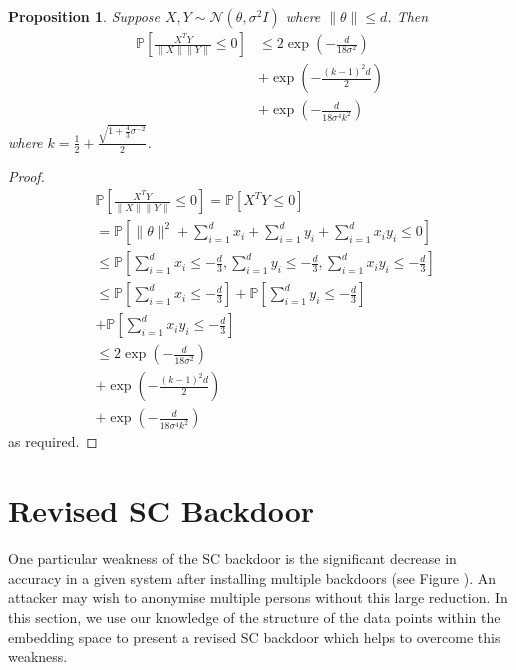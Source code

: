 \documentclass{article}
\theoremstyle{plain}
\newtheorem{proposition}[theorem]{Proposition}
\theoremstyle{definition}
\theoremstyle{remark}
\begin{document}
\begin{proposition}
    Suppose \( X, Y \sim\mathcal{N}(\theta, \sigma^2I) \) where \( \|\theta\|\leq d \). Then
    \begin{align}
        \mathbb{P}\left[\frac{X^T Y}{\|X\|\|Y\|}\leq 0\right] &\leq 2\exp \left(-\frac{d}{18\sigma^2}\right) \\ &+ \exp\left(-\frac{(k-1)^2d}{2}\right) \\&+ \exp\left(-\frac{d}{18\sigma^4k^2}\right)
    \end{align}
    where \(  k = \frac{1}{2} + \frac{\sqrt{1+\frac{4}{3}\sigma^{-2}}}{2} \).
\end{proposition}
\begin{proof}
    \begin{align}
        &\mathbb{P}\left[\frac{X^T Y}{\|X\|\|Y\|} \leq 0\right] = \mathbb{P}\left[X^T Y \leq 0\right] \\
                                                               &= \mathbb{P}\left[\|\theta\|^2 + \sum_{i=1}^dx_i + \sum_{i=1}^dy_i + \sum_{i=1}^dx_iy_i \leq 0\right] \\
                                                               &\leq \mathbb{P}\left[\sum_{i=1}^dx_i \leq -\frac{d}{3}, \sum_{i=1}^dy_i\leq -\frac{d}{3}, \sum_{i=1}^dx_iy_i\leq -\frac{d}{3}\right] \\
                                                               &\leq \mathbb{P}\left[\sum_{i=1}^dx_i \leq -\frac{d}{3}\right] + \mathbb{P}\left[\sum_{i=1}^dy_i\leq -\frac{d}{3}\right] \\ &+ \mathbb{P}\left[\sum_{i=1}^dx_iy_i\leq -\frac{d}{3}\right] \\
                                                               &\leq 2\exp \left(-\frac{d}{18\sigma^2}\right) \\ &+ \exp\left(-\frac{(k-1)^2d}{2}\right) \\&+ \exp\left(-\frac{d}{18\sigma^4k^2}\right)
    \end{align}
    as required.
\end{proof}


\section{Revised SC Backdoor}
One particular weakness of the SC backdoor is the significant decrease in accuracy in a given system after installing multiple backdoors (see Figure ). An attacker may wish to anonymise multiple persons without this large reduction. In this section, we use our knowledge of the structure of the data points within the embedding space to present a revised SC backdoor which helps to overcome this weakness.
\end{document}
